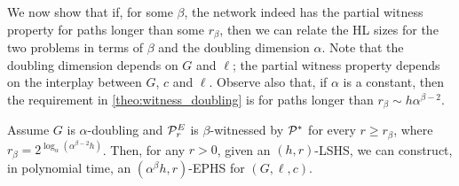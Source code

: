 We now show that if, for some $\beta$, the network indeed has the partial witness property for paths longer than some $r_\beta$, then we can relate the HL sizes for the two problems in terms of $\beta$ and the doubling dimension $\alpha$. 
Note that the doubling dimension depends on $G$ and $\ell$; the partial witness property depends on the interplay between $G$, $c$ and $\ell$.
Observe also that, if $\alpha$ is a constant, then the requirement in \cref{theo:witness_doubling} is for paths longer than $r_\beta\sim h\alpha^{\beta-2}$.
\begin{theorem}\label{theo:witness_doubling}
	Assume $G$ is $\alpha$-doubling and $\mathcal{P}^E_r$ is $\beta$-witnessed by $\mathcal{P}^*$ for every $r\geq r_\beta$, where $r_\beta=2^{\log_\alpha(\alpha^{\beta-2} h)}$. 
	Then, for any $r>0$, given an $(h,r)$-LSHS, we can construct, in polynomial time, an $(\alpha^{\beta} h,r)$-EPHS for $(G,\ell,c)$. 
\end{theorem}

